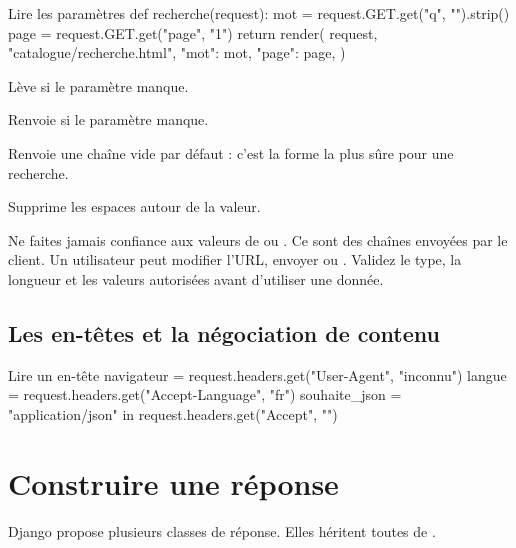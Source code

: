 \begin{codebox}[python]{Lire les paramètres}
def recherche(request):
    mot = request.GET.get("q", "").strip()
    page = request.GET.get("page", "1")
    return render(
        request,
        "catalogue/recherche.html",
        {"mot": mot, "page": page},
    )
\end{codebox}

\begin{description}[leftmargin=4.3cm,style=nextline]
  \item[\code{request.GET["q"]}] Lève  si le paramètre manque.
  \item[\code{request.GET.get("q")}] Renvoie  si le paramètre manque.
  \item[\code{request.GET.get("q", "")}] Renvoie une chaîne vide par défaut :
  c'est la forme la plus sûre pour une recherche.
  \item[\code{.strip()}] Supprime les espaces autour de la valeur.
\end{description}

\begin{attention}
Ne faites jamais confiance aux valeurs de  ou
. Ce sont des chaînes envoyées par le client. Un utilisateur
peut modifier l'URL, envoyer  ou . Validez le type, la
longueur et les valeurs autorisées avant d'utiliser une donnée.
\end{attention}

\subsection{Les en-têtes et la négociation de contenu}

\begin{codebox}[python]{Lire un en-tête}
navigateur = request.headers.get("User-Agent", "inconnu")
langue = request.headers.get("Accept-Language", "fr")
souhaite_json = "application/json" in request.headers.get("Accept", "")
\end{codebox}

\section{Construire une réponse}

Django propose plusieurs classes de réponse. Elles héritent toutes de
.


